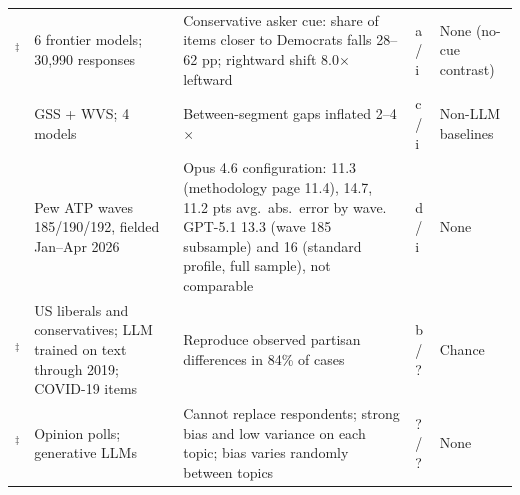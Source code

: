 \documentclass[11pt]{article}
\newcommand{\ab}{$^\ddagger$}
\begin{document}
\begin{table}[p]
\begin{tabular}{@{}L{1.9cm}L{2.7cm}L{5.4cm}L{0.9cm}L{3.3cm}@{}}
\citet{tornberg2026}\ab & 6 frontier models; 30,990 responses & Conservative asker cue: share of items closer to Democrats falls 28--62 pp; rightward shift 8.0$\times$ leftward & a / i & None (no-cue contrast) \\
\citet{chen2026synthetic} & GSS + WVS; 4 models & Between-segment gaps inflated 2--4$\times$ & c / i & Non-LLM baselines \\
\citet{pew2026} & Pew ATP waves 185/190/192, fielded Jan--Apr 2026 & Opus 4.6 configuration: 11.3 (methodology page 11.4), 14.7, 11.2 pts avg.\ abs.\ error by wave. GPT-5.1 13.3 (wave 185 subsample) and 16 (standard profile, full sample), not comparable & d / i & None \\
\citet{kozlowski2024}\ab & US liberals and conservatives; LLM trained on text through 2019; COVID-19 items & Reproduce observed partisan differences in 84\% of cases & b / ? & Chance \\
\citet{boelaert2025}\ab & Opinion polls; generative LLMs & Cannot replace respondents; strong bias and low variance on each topic; bias varies randomly between topics & ? / ? & None \\
\bottomrule
\end{tabular}
\end{table}
\end{document}
